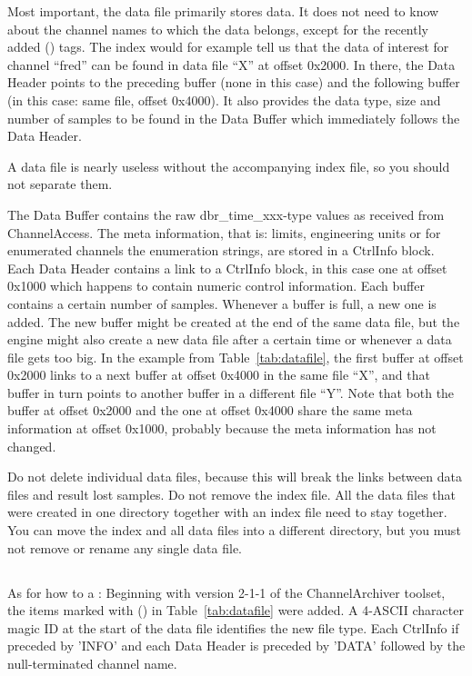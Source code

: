 Most important, the data file primarily stores data. It does not need
to know about the channel names to which the data belongs, except for
the recently added (\dag) tags. The index would for example tell us
that the data of interest for channel ``fred'' can be found in data
file ``X'' at offset 0x2000. In there, the Data Header points to the
preceding buffer (none in this case) and the following buffer (in this
case: same file, offset 0x4000). It also provides the data type, size
and number of samples to be found in the Data Buffer
which immediately follows the Data Header.

 A data file is nearly useless without the
accompanying index file, so you should not separate them.

\noindent The Data Buffer contains the raw dbr\_time\_xxx-type values
as received from ChannelAccess. The meta information, that is: limits,
engineering units or for enumerated channels the enumeration strings,
are stored in a CtrlInfo block. Each Data Header contains a link to a
CtrlInfo block, in this case one at offset 0x1000 which happens to
contain numeric control information.
Each buffer contains a certain number of samples. Whenever a buffer is
full, a new one is added. The new buffer might be created at the end
of the same data file, but the engine might also create a new data
file after a certain time or whenever a data file gets too big.
In the example from Table~\ref{tab:datafile}, the first buffer at offset
0x2000 links to a next buffer at offset 0x4000 in the same file ``X'',
and that buffer in turn points to another buffer in a different file
``Y''. Note that both the buffer at offset 0x2000 and the one at
offset 0x4000 share the same meta information at offset 0x1000,
probably because the meta information has not changed.

 Do not delete individual data
files, because this will break the links between data files and result
lost samples. Do not remove the index file. All the data files that were
created in one directory together with an index file need to stay together.
You can move the index and all data files into a different directory, but
you must not remove or rename any single data file.

\subsection{}
As for how to  a :
Beginning with version 2-1-1 of the ChannelArchiver toolset, the items
marked with (\dag) in Table~\ref{tab:datafile} were added.  A
4-ASCII character magic ID at the start of the data file identifies
the new file type. Each CtrlInfo if preceded by 'INFO' and each Data
Header is preceded by 'DATA' followed by the null-terminated channel
name.

